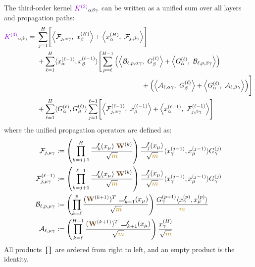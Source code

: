 \documentclass[a4paper]{article}
\DeclareRobustCommand{\ReLU}{\mathrel{\text{%
    \begin{tikzpicture}[baseline=(current bounding box.south)]
        \draw[thick] (0,0) -- (0.25,0) -- (0.4,0.25);
    \end{tikzpicture}}}\!\!}
\theoremstyle{plain}
\theoremstyle{definition}
\theoremstyle{remark}
\begin{document}
\begin{tcolorbox}[colback=theoremcolor!10,colframe=theoremcolor!60!black,title={\textbf{Unified Structure of $\textcolor{k3color}{K^{(3)}}$}},enhanced,drop shadow]
The third-order kernel $\textcolor{k3color}{K^{(3)}}_{\alpha\beta\gamma}$ can be written as a unified sum over all layers and propagation paths:
\begin{align}
\textcolor{k3color}{K^{(3)}}_{\alpha\beta\gamma} =\ 
&\sum_{j=1}^{H} \Biggl[
    \left\langle \mathcal{F}_{j,\alpha\gamma} ,\ x^{(H)}_\beta \right\rangle
    + \left\langle x^{(H)}_\alpha,\ \mathcal{F}_{j,\beta\gamma} \right\rangle
\Biggr] \nonumber \\
&+ \sum_{\ell=1}^{H} \langle x^{(\ell-1)}_\alpha, x^{(\ell-1)}_\beta \rangle \Biggl[
    \sum_{p=\ell}^{H-1} \left(
        \left\langle \mathcal{B}_{\ell,p,\alpha\gamma},\ G^{(\ell)}_\beta \right\rangle
        + \left\langle G^{(\ell)}_\alpha,\ \mathcal{B}_{\ell,p,\beta\gamma} \right\rangle
    \right) \nonumber \\
&\hspace{5.5cm}
    + \left(
        \left\langle \mathcal{A}_{\ell,\alpha\gamma},\ G^{(\ell)}_\beta \right\rangle
        + \left\langle G^{(\ell)}_\alpha,\ \mathcal{A}_{\ell,\beta\gamma} \right\rangle
    \right)
\Biggr] \nonumber \\
&+ \sum_{\ell=1}^{H} \langle G^{(\ell)}_\alpha, G^{(\ell)}_\beta \rangle \sum_{j=1}^{\ell-1} \Biggl[
    \left\langle \mathcal{F}_{j,\alpha\gamma}^{(\ell-1)},\ x^{(\ell-1)}_\beta \right\rangle
    + \left\langle x^{(\ell-1)}_\alpha,\ \mathcal{F}_{j,\beta\gamma}^{(\ell-1)} \right\rangle
\Biggr]
\end{align}
where the unified propagation operators are defined as:
\begin{align*}
\mathcal{F}_{j,\mu\gamma} &:= \left( \prod_{k=j+1}^{H} \frac{\textcolor{relucolor}{\ReLU}'_{k}(x_\mu)\ \textcolor{weightcolor}{\mathbf{W}}^{(k)}}{\sqrt{\textcolor{darkyellow}{m}}} \right) \frac{\textcolor{relucolor}{\ReLU}'_{j}(x_\mu)}{\sqrt{\textcolor{darkyellow}{m}}} \langle x^{(j-1)}_\gamma, x^{(j-1)}_\mu \rangle G^{(j)}_\gamma \\
\mathcal{F}_{j,\mu\gamma}^{(\ell-1)} &:= \left( \prod_{k=j+1}^{\ell-1} \frac{\textcolor{relucolor}{\ReLU}'_{k}(x_\mu)\ \textcolor{weightcolor}{\mathbf{W}}^{(k)}}{\sqrt{\textcolor{darkyellow}{m}}} \right) \frac{\textcolor{relucolor}{\ReLU}'_{j}(x_\mu)}{\sqrt{\textcolor{darkyellow}{m}}} \langle x^{(j-1)}_\gamma, x^{(j-1)}_\mu \rangle G^{(j)}_\gamma \\
\mathcal{B}_{\ell,p,\mu\gamma} &:= \left( \prod_{k=\ell}^{p} \frac{(\textcolor{weightcolor}{\mathbf{W}}^{(k+1)})^T\ \textcolor{relucolor}{\ReLU}'_{k+1}(x_\mu)}{\sqrt{\textcolor{darkyellow}{m}}} \right) \frac{G^{(p+1)}_\gamma \langle x^{(p)}_\gamma, x^{(p)}_\mu \rangle}{\textcolor{darkyellow}{m}} \\
\mathcal{A}_{\ell,\mu\gamma} &:= \left( \prod_{k=\ell}^{H-1} \frac{(\textcolor{weightcolor}{\mathbf{W}}^{(k+1)})^T\ \textcolor{relucolor}{\ReLU}'_{k+1}(x_\mu)}{\sqrt{\textcolor{darkyellow}{m}}} \right) \frac{x^{(H)}_\gamma}{\sqrt{\textcolor{darkyellow}{m}}}
\end{align*}
All products $\prod$ are ordered from right to left, and an empty product is the identity.


\end{tcolorbox}
\end{document}

